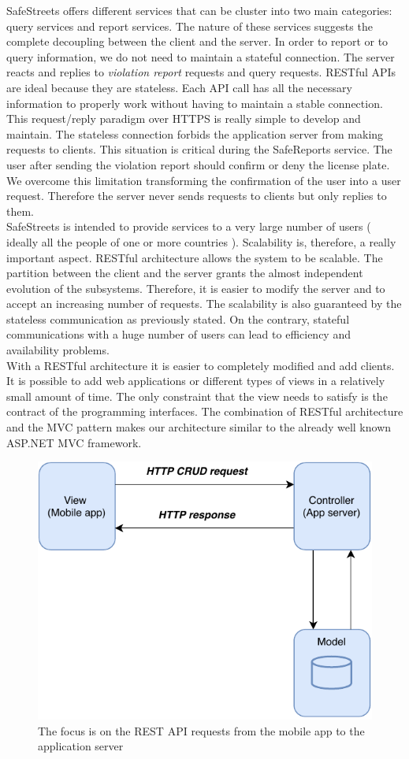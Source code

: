\documentclass[./main.tex]{subfiles}
\begin{document}
SafeStreets offers different services that can be cluster into two main categories: query services and report services. The nature of these services suggests the complete decoupling between the client and the server. In order to report or to query information, we do not need to maintain a stateful connection. 
The server reacts and replies to \textit{violation report} requests and query requests. 
RESTful APIs are ideal because they are stateless. Each API call has all the necessary information to properly work without having to maintain a stable connection. 
This request/reply paradigm over HTTPS is really simple to develop and maintain.
The stateless connection forbids the application server from making requests to clients. This situation is critical during the SafeReports service. The user after sending the violation report should confirm or deny the license plate. We overcome this limitation transforming the confirmation of the user into a user request. Therefore the server never sends requests to clients but only replies to them.
\\
SafeStreets is intended to provide services to a very large number of users ( ideally all the people of one or more countries ). Scalability is, therefore, a really important aspect. 
RESTful architecture allows the system to be scalable. The partition between the client and the server grants the almost independent evolution of the subsystems. Therefore, it is easier to modify the server and to accept an increasing number of requests. The scalability is also guaranteed by the stateless communication as previously stated. On the contrary, stateful communications with a huge number of users can lead to efficiency and availability problems.
\\
With a RESTful architecture it is easier to completely modified and add clients.  It is possible to add web applications or different types of views in a relatively small amount of time. The only constraint that the view needs to satisfy is the contract of the programming interfaces. The combination of RESTful architecture and the MVC pattern makes our architecture similar to the already well known ASP.NET MVC framework. 

\begin{figure}[H]
\centering
\includegraphics[width = .7 \textwidth]{resources/Patterns/api}
\caption{The focus is on the REST API requests from the mobile app to the application server}
\label{fig:api}
\end{figure}
\end{document}
